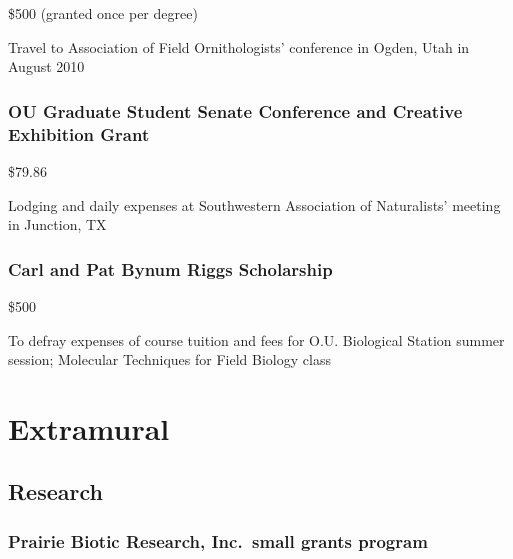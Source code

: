 \documentclass[
  letterpaper,
  DIV=11,
  numbers=noendperiod,
  oneside]{scrreprt}
\begin{document}
\$500 (granted once per degree)


Travel to Association of Field Ornithologists' conference in Ogden, Utah
in August 2010

\subsubsection{OU Graduate Student Senate Conference and Creative
Exhibition
Grant}\label{ou-graduate-student-senate-conference-and-creative-exhibition-grant}

\$79.86


Lodging and daily expenses at Southwestern Association of Naturalists'
meeting in Junction, TX

\subsubsection{Carl and Pat Bynum Riggs
Scholarship}\label{carl-and-pat-bynum-riggs-scholarship}

\$500


To defray expenses of course tuition and fees for O.U. Biological
Station summer session; Molecular Techniques for Field Biology class

\section{Extramural}\label{extramural}

\subsection{Research}\label{research}

\subsubsection{Prairie Biotic Research, Inc.~small grants
program}\label{prairie-biotic-research-inc.-small-grants-program}
\end{document}
